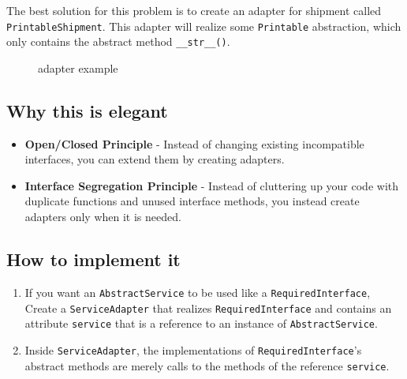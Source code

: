 The best solution for this problem is to create an adapter for shipment
called \texttt{PrintableShipment}. This adapter will realize some
\texttt{Printable} abstraction, which only contains the abstract method
\texttt{\_\_str\_\_()}.

\begin{figure}
\centering
{}
\caption{adapter example}
\end{figure}

\subsection{Why this is
elegant}\label{structural-patterns.md__why-this-is-elegant-1}

\begin{itemize}
\tightlist
\item
  \textbf{Open/Closed Principle} - Instead of changing existing
  incompatible interfaces, you can extend them by creating adapters.
\item
  \textbf{Interface Segregation Principle} - Instead of cluttering up
  your code with duplicate functions and unused interface methods, you
  instead create adapters only when it is needed.
\end{itemize}

\subsection{How to implement
it}\label{structural-patterns.md__how-to-implement-it-1}

\begin{enumerate}
\def\labelenumi{\arabic{enumi}.}
\tightlist
\item
  If you want an \texttt{AbstractService} to be used like a
  \texttt{RequiredInterface}, Create a \texttt{ServiceAdapter} that
  realizes \texttt{RequiredInterface} and contains an attribute
  \texttt{service} that is a reference to an instance of
  \texttt{AbstractService}.
\item
  Inside \texttt{ServiceAdapter}, the implementations of
  \texttt{RequiredInterface}'s abstract methods are merely calls to the
  methods of the reference \texttt{service}.
\end{enumerate}

